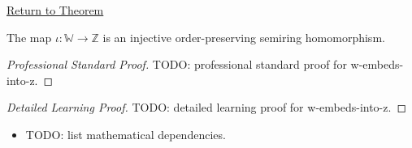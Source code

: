 \newpage
{}
\label{prf:w-embeds-into-z}

\begin{remark*}[Return]
\hyperref[thm:w-embeds-into-z]{Return to Theorem}
\end{remark*}

\begin{theorem*}
The map $\iota:\mathbb{W}\to\mathbb{Z}$ is an injective order-preserving
semiring homomorphism.
\end{theorem*}

\begin{proof}[Professional Standard Proof]
\LRAProofBodyStart
TODO: professional standard proof for w-embeds-into-z.
\end{proof}

\begin{proof}[Detailed Learning Proof]
\LRAProofBodyStart
TODO: detailed learning proof for w-embeds-into-z.
\end{proof}

\begin{remark*}
\end{remark*}

\begin{dependencies}
\begin{itemize}
  \item TODO: list mathematical dependencies.
\end{itemize}
\end{dependencies}

\clearpage
